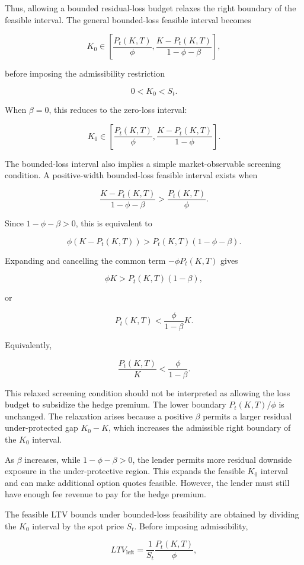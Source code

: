 \documentclass[11pt]{article}
\begin{document}
Thus, allowing a bounded residual-loss budget relaxes the right boundary of the feasible interval. The general bounded-loss feasible interval becomes

$$
K_0
\in
\left[
\frac{P_t(K,T)}{\phi},
\frac{K-P_t(K,T)}{1-\phi-\beta}
\right],
$$

before imposing the admissibility restriction

$$
0<K_0<S_t.
$$

When $\beta=0$, this reduces to the zero-loss interval:

$$
K_0
\in
\left[
\frac{P_t(K,T)}{\phi},
\frac{K-P_t(K,T)}{1-\phi}
\right].
$$

The bounded-loss interval also implies a simple market-observable screening condition. A positive-width bounded-loss feasible interval exists when

$$
\frac{K-P_t(K,T)}{1-\phi-\beta}
>
\frac{P_t(K,T)}{\phi}.
$$

Since $1-\phi-\beta>0$, this is equivalent to

$$
\phi\left(K-P_t(K,T)\right)
>
P_t(K,T)(1-\phi-\beta).
$$

Expanding and cancelling the common term $-\phi P_t(K,T)$ gives

$$
\phi K > P_t(K,T)(1-\beta),
$$

or

$$
P_t(K,T)
<
\frac{\phi}{1-\beta}K.
$$

Equivalently,

$$
\frac{P_t(K,T)}{K}
<
\frac{\phi}{1-\beta}.
$$

This relaxed screening condition should not be interpreted as allowing the loss budget to subsidize the hedge premium. The lower boundary $P_t(K,T)/\phi$ is unchanged. The relaxation arises because a positive $\beta$ permits a larger residual under-protected gap $K_0-K$, which increases the admissible right boundary of the $K_0$ interval.

As $\beta$ increases, while $1-\phi-\beta>0$, the lender permits more residual downside exposure in the under-protective region. This expands the feasible $K_0$ interval and can make additional option quotes feasible. However, the lender must still have enough fee revenue to pay for the hedge premium.

The feasible LTV bounds under bounded-loss feasibility are obtained by dividing the $K_0$ interval by the spot price $S_t$. Before imposing admissibility,

$$
LTV_{\text{left}}
=
\frac{1}{S_t}
\frac{P_t(K,T)}{\phi},
$$
\end{document}
